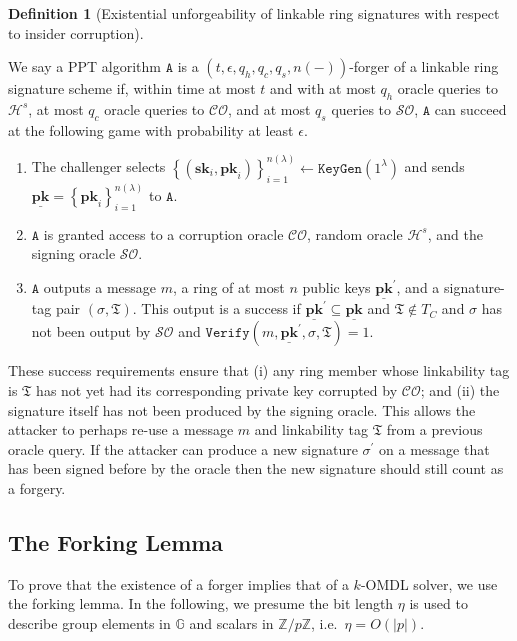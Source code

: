 \documentclass{mrl}
\theoremstyle{plain}
\theoremstyle{definition}
\newtheorem{defn}{Definition}[section]
\begin{document}
\begin{defn}[Existential unforgeability of linkable ring signatures with respect to insider corruption]\label{def:unf}

We say a PPT algorithm $\texttt{A}$  is a $(t, \epsilon, q_h, q_c, q_s,  n(-))$-forger of a linkable ring signature scheme if, within time at most $t$ and with at most $q_h$ oracle queries to $\mathcal{H}^s$, at most $q_c$ oracle queries to $\mathcal{CO}$, and at most $q_s$ queries to $\mathcal{SO}$, $\texttt{A}$ can succeed at the following game with probability at least $\epsilon$.
\begin{enumerate}
\item The challenger selects $\left\{(\textbf{sk}_i, \textbf{pk}_i)\right\}_{i=1}^{n(\lambda)} \leftarrow \texttt{KeyGen}(1^\lambda)$ and sends $\underline{\textbf{pk}} = \left\{\textbf{pk}_i\right\}_{i=1}^{n(\lambda)}$ to $\texttt{A}$. 

\item $\texttt{A}$ is granted access to a corruption oracle $\mathcal{CO}$, random oracle $\mathcal{H}^s$, and the signing oracle $\mathcal{SO}$.

\item $\texttt{A}$ outputs a message $m$, a ring of at most $n$ public keys $\underline{\textbf{pk}}^\prime$, and a signature-tag pair $(\sigma, \mathfrak{T})$. This output is a success if $\underline{\textbf{pk}}^\prime \subseteq \underline{\textbf{pk}}$ and $\mathfrak{T} \notin T_C$ and $\sigma$ has not been output by $\mathcal{SO}$ and $\texttt{Verify}(m, \underline{\textbf{pk}}^\prime, \sigma, \mathfrak{T}) = 1$.

\end{enumerate}
\end{defn}

These success requirements ensure that (i) any ring member whose linkability tag is $\mathfrak{T}$ has not yet had its corresponding private key corrupted by $\mathcal{CO}$; and (ii) the signature itself has not been produced by the signing oracle. This allows the attacker to perhaps re-use a message $m$ and linkability tag $\mathfrak{T}$ from a previous oracle query. If the attacker can produce a new signature $\sigma^\prime$ on a message that has been signed before by the oracle then the new signature should still count as a forgery.


\subsection{The Forking Lemma} To prove that the existence of a forger implies that of a $k$-OMDL solver, we use the forking lemma. In the following, we presume the bit length $\eta$ is used to describe group elements in $\mathbb{G}$ and scalars in $\mathbb{Z}/p\mathbb{Z}$, i.e.\ $\eta = O(\left|p\right|)$.
\end{document}
